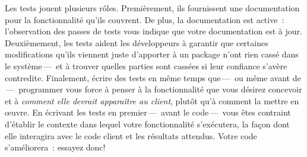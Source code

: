 \documentclass[a4paper,10pt,twoside]{book}
\begin{document}

Les tests jouent plusieurs rôles. Premièrement, ils fournissent une
documentation pour la fonctionnalité qu'ils couvrent. De plus, la
documentation est active~: l'observation des passes de tests vous
indique que votre documentation est à jour. Deuxièmement, les tests
aident les développeurs à garantir que certaines modifications qu'ils
viennent juste d'apporter à un package n'ont rien cassé dans le
système\,---\, et à trouver quelles parties sont cassées si leur
confiance s'avère contredite. Finalement, écrire des tests en même
temps que\,---\, ou même avant de \,---\,  programmer vous force à
penser à la fonctionnalité que vous désirez concevoir et à
\emph{comment elle devrait apparaître au client}, plutôt qu'à comment
la mettre en \oe uvre. En écrivant les tests en premier\,---\, avant
le code\,---\, vous êtes contraint d'établir le contexte dans lequel
votre fonctionnalité s'exécutera, la façon dont elle interagira avec
le code client et les résultats attendus. Votre code s'améliorera~:
essayez donc!
 
\end{document}
